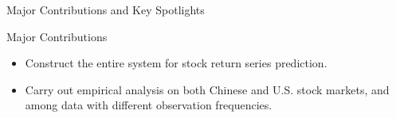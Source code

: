 \begin{frame}[fragile,t]{Major Contributions and Key Spotlights}



	\begin{block}{Major Contributions}
	\begin{itemize}
		\item 
		Construct the \alert{entire} system for stock return series prediction.
		\item 
		Carry out empirical analysis on both Chinese and U.S. stock markets,
		and among data with different observation frequencies.
	\end{itemize}
	\end{block}


\end{frame}
